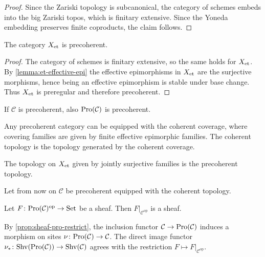 \begin{proof}
    \leanok
    Since the Zariski topology is subcanonical, the category of schemes embeds
    into the big Zariski topos, which is finitary extensive. Since
    the Yoneda embedding preserves finite coproducts, the claim follows.
\end{proof}

\begin{lemma}
    The category $X_{\mathrm{et}}$ is precoherent.
    \label{lemma:et-precoherent}
    \leanok
\end{lemma}

\begin{proof}
    \leanok
    The category of schemes is finitary extensive, so the same holds
    for $X_{\mathrm{et}}$. By \ref{lemma:et-effective-epi} the effective epimorphisms
    in $X_{\mathrm{et}}$ are the surjective morphisms, hence being an effective epimorphism
    is stable under base change. Thus $X_{\mathrm{et}}$ is preregular and therefore precoherent.
\end{proof}

\begin{proposition}
    If $\mathcal{C}$ is precoherent, also $\mathrm{Pro}(\mathcal{C})$ is precoherent.
    \label{prop:pro-precoherent}
\end{proposition}

Any precoherent category can be equipped with the coherent coverage, where covering families are given by
finite effective epimorphic families. The coherent topology is the topology generated by the coherent coverage.

\begin{lemma}
    The topology on $X_{\mathrm{et}}$ given by jointly surjective families is the precoherent topology.
    \label{lemma:et-precoherent-topology}
\end{lemma}

Let from now on $\mathcal{C}$ be precoherent equipped with the coherent topology.

\begin{proposition}
    Let $F \colon \mathrm{Pro}(\mathcal{C})^{\mathrm{op}} \to \mathrm{Set}$ be a sheaf. Then
    $F|_{\mathcal{C}^{\mathrm{op}}}$ is a sheaf.
    \label{prop:sheaf-pro-restrict}
\end{proposition}

By \ref{prop:sheaf-pro-restrict}, the inclusion functor $\mathcal{C} \to \mathrm{Pro}(\mathcal{C})$ induces a morphism on sites
$\nu\colon \mathrm{Pro}(\mathcal{C}) \to \mathcal{C}$.
The direct image functor $\nu_{*}\colon \mathrm{Shv}(\mathrm{Pro}(\mathcal{C})) \to \mathrm{Shv}(\mathcal{C})$ agrees with the
restriction $F \mapsto F|_{\mathcal{C}^{\mathrm{op}}}$.

